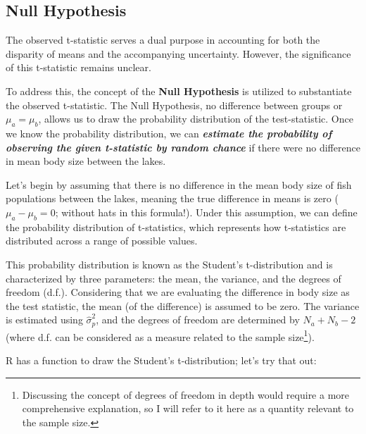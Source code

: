 \documentclass[
]{book}
\begin{document}
\hypertarget{null-hypothesis}{%
\subsection{Null Hypothesis}\label{null-hypothesis}}

The observed t-statistic serves a dual purpose in accounting for both the disparity of means and the accompanying uncertainty. However, the significance of this t-statistic remains unclear.

To address this, the concept of the \textbf{Null Hypothesis} is utilized to substantiate the observed t-statistic. The Null Hypothesis, no difference between groups or \(\mu_a = \mu_b\), allows us to draw the probability distribution of the test-statistic. Once we know the probability distribution, we can \textbf{\emph{estimate the probability of observing the given t-statistic by random chance}} if there were no difference in mean body size between the lakes.

Let's begin by assuming that there is no difference in the mean body size of fish populations between the lakes, meaning the true difference in means is zero (\(\mu_a - \mu_b = 0\); without hats in this formula!). Under this assumption, we can define the probability distribution of t-statistics, which represents how t-statistics are distributed across a range of possible values.

This probability distribution is known as the Student's t-distribution and is characterized by three parameters: the mean, the variance, and the degrees of freedom (d.f.). Considering that we are evaluating the difference in body size as the test statistic, the mean (of the difference) is assumed to be zero. The variance is estimated using \(\hat{\sigma}^2_p\), and the degrees of freedom are determined by \(N_a + N_b - 2\) (where d.f. can be considered as a measure related to the sample size\footnote{Discussing the concept of degrees of freedom in depth would require a more comprehensive explanation, so I will refer to it here as a quantity relevant to the sample size.}).

R has a function to draw the Student's t-distribution; let's try that out:
\end{document}
